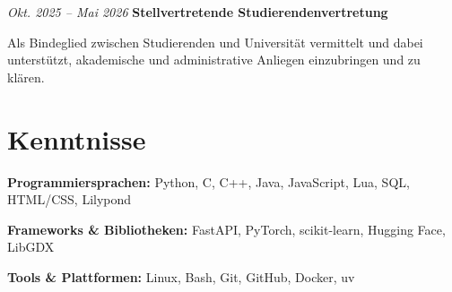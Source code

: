 \documentclass[german]{cv}
\begin{document}
        \vspace{0.13 cm}

        \begin{twocolentry}{
        \textit{Okt. 2025 – Mai 2026}}
            \textbf{Stellvertretende Studierendenvertretung}
        \end{twocolentry}

        \vspace{0.10 cm}
        \begin{onecolentry}
            \begin{highlights}
                \item Als Bindeglied zwischen Studierenden und Universität vermittelt und dabei unterstützt, akademische und administrative Anliegen einzubringen und zu klären.
            \end{highlights}
        \end{onecolentry}

    \section{Kenntnisse}

        \begin{onecolentry}
            \textbf{Programmiersprachen:} Python, C, C++, Java, JavaScript, Lua, SQL, HTML/CSS, Lilypond
        \end{onecolentry}

        \vspace{0.13 cm}

        \begin{onecolentry}
            \textbf{Frameworks \& Bibliotheken:} FastAPI, PyTorch, scikit-learn, Hugging Face, LibGDX
        \end{onecolentry}

        \vspace{0.13 cm}

        \begin{onecolentry}
            \textbf{Tools \& Plattformen:} Linux, Bash, Git, GitHub, Docker, uv
        \end{onecolentry}
\end{document}
